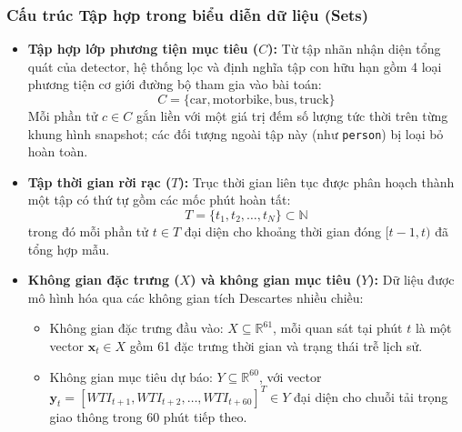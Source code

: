 \subsubsection{Cấu trúc Tập hợp trong biểu diễn dữ liệu (Sets)}
\begin{itemize}
    \item \textbf{Tập hợp lớp phương tiện mục tiêu ($C$):} Từ tập nhãn nhận diện tổng quát của detector, hệ thống lọc và định nghĩa tập con hữu hạn gồm 4 loại phương tiện cơ giới đường bộ tham gia vào bài toán:
    \begin{equation*}
        C = \{\text{car}, \text{motorbike}, \text{bus}, \text{truck}\}
    \end{equation*}
    Mỗi phần tử $c \in C$ gắn liền với một giá trị đếm số lượng tức thời trên từng khung hình snapshot; các đối tượng ngoài tập này (như \texttt{person}) bị loại bỏ hoàn toàn.

    \item \textbf{Tập thời gian rời rạc ($T$):} Trục thời gian liên tục được phân hoạch thành một tập có thứ tự gồm các mốc phút hoàn tất:
    \begin{equation*}
        T = \{t_1, t_2, \dots, t_N\} \subset \mathbb{N}
    \end{equation*}
    trong đó mỗi phần tử $t \in T$ đại diện cho khoảng thời gian đóng $[t-1, t)$ đã tổng hợp mẫu.

    \item \textbf{Không gian đặc trưng ($X$) và không gian mục tiêu ($Y$):} 
    Dữ liệu được mô hình hóa qua các không gian tích Descartes nhiều chiều:
    \begin{itemize}
        \item Không gian đặc trưng đầu vào: $X \subseteq \mathbb{R}^{61}$, mỗi quan sát tại phút $t$ là một vector $\mathbf{x}_t \in X$ gồm 61 đặc trưng thời gian và trạng thái trễ lịch sử.
        \item Không gian mục tiêu dự báo: $Y \subseteq \mathbb{R}^{60}$, với vector $\mathbf{y}_t = [WTI_{t+1}, WTI_{t+2}, \dots, WTI_{t+60}]^T \in Y$ đại diện cho chuỗi tải trọng giao thông trong 60 phút tiếp theo.
    \end{itemize}
\end{itemize}

